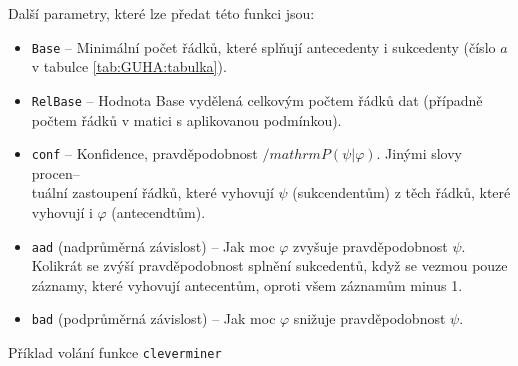 Další parametry, které lze předat této funkci jsou:
\begin{itemize}
    \itemsep0em
    \item \texttt{Base} -- Minimální počet řádků, které splňují antecedenty i sukcedenty (číslo $a$ v tabulce \ref*{tab:GUHA:tabulka}).
    \item \texttt{RelBase} -- Hodnota Base vydělená celkovým počtem řádků dat (případně počtem řádků v matici s aplikovanou podmínkou).
    \item \texttt{conf} -- Konfidence, pravděpodobnost $/mathrm{P}(\psi|\varphi)$. Jinými slovy procen--\\tuální zastoupení řádků, které vyhovují $\psi$ (sukcendentům) z těch řádků, které vyhovují i $\varphi$ (antecendtům).
    \item \texttt{aad} (nadprůměrná závislost) -- Jak moc $\varphi$ zvyšuje  pravděpodobnost $\psi$. Kolikrát se zvýší pravděpodobnost splnění sukcedentů, když se vezmou pouze záznamy, které vyhovují antecentům, oproti všem záznamům minus 1.
    \item \texttt{bad} (podprůměrná závislost) -- Jak moc $\varphi$ snižuje  pravděpodobnost $\psi$.
\end{itemize}

Příklad volání funkce \texttt{cleverminer}


\begin{lstlisting}[language=Python, style=mystyle, label={code:colnames}, caption={Příklad volání funkce \texttt{cleverminer}.}]

\end{lstlisting}



